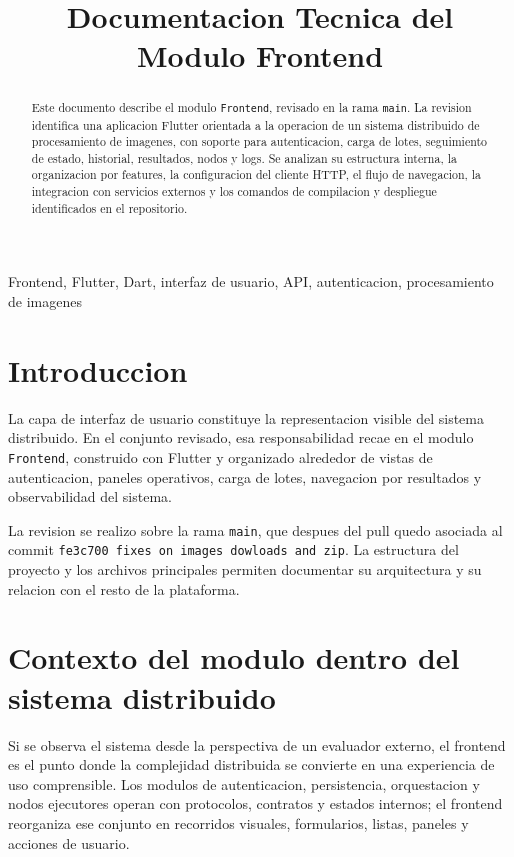 \documentclass[conference]{IEEEtran}
\title{Documentacion Tecnica del Modulo Frontend}
\author{
\IEEEauthorblockN{Christian Mauricio Rodriguez Curubo, Santos Enmanuel Manosalva Aceros}
\IEEEauthorblockA{Universidad Pontificia Bolivariana Seccional Bucaramanga\\
Sistemas Distribuidos\\
Docente: Audo Al\'i Diaz}
}
\begin{document}
\maketitle

\begin{abstract}
Este documento describe el modulo \texttt{Frontend}, revisado en la rama \texttt{main}. La revision identifica una aplicacion Flutter orientada a la operacion de un sistema distribuido de procesamiento de imagenes, con soporte para autenticacion, carga de lotes, seguimiento de estado, historial, resultados, nodos y logs. Se analizan su estructura interna, la organizacion por features, la configuracion del cliente HTTP, el flujo de navegacion, la integracion con servicios externos y los comandos de compilacion y despliegue identificados en el repositorio.
\end{abstract}

\begin{IEEEkeywords}
Frontend, Flutter, Dart, interfaz de usuario, API, autenticacion, procesamiento de imagenes
\end{IEEEkeywords}

\section{Introduccion}
La capa de interfaz de usuario constituye la representacion visible del sistema distribuido. En el conjunto revisado, esa responsabilidad recae en el modulo \texttt{Frontend}, construido con Flutter y organizado alrededor de vistas de autenticacion, paneles operativos, carga de lotes, navegacion por resultados y observabilidad del sistema.

La revision se realizo sobre la rama \texttt{main}, que despues del pull quedo asociada al commit \texttt{fe3c700 fixes on images dowloads and zip}. La estructura del proyecto y los archivos principales permiten documentar su arquitectura y su relacion con el resto de la plataforma.

\section{Contexto del modulo dentro del sistema distribuido}
Si se observa el sistema desde la perspectiva de un evaluador externo, el frontend es el punto donde la complejidad distribuida se convierte en una experiencia de uso comprensible. Los modulos de autenticacion, persistencia, orquestacion y nodos ejecutores operan con protocolos, contratos y estados internos; el frontend reorganiza ese conjunto en recorridos visuales, formularios, listas, paneles y acciones de usuario.
\end{document}
